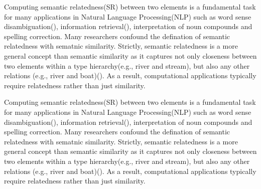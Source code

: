 Computing semantic relatedness(SR) between two elements is a fundamental 
task for many applications in Natural Language Processing(NLP) such as 
word sense disambiguation(\cite{}), information retrieval(\cite{}), 
interpretation of noun compounds and spelling correction. Many researchers
confound the defination of semantic relatedness with sematnic similarity.
Strictly, semantic relatedness is a more general concept than semantic 
similarity as it captures not only closeness between two elements within
a type hierarchy(e.g., river and stream), but also any other relations
(e.g., river and boat)(\cite{BudanitskyH06}). As a result, computational
applications typically require relatedness rather than just similarity.

Computing semantic relatedness(SR) between two elements is a fundamental 
task for many applications in Natural Language Processing(NLP) such as 
word sense disambiguation(\cite{}), information retrieval(\cite{}), 
interpretation of noun compounds and spelling correction. Many researchers
confound the defination of semantic relatedness with sematnic similarity.
Strictly, semantic relatedness is a more general concept than semantic 
similarity as it captures not only closeness between two elements within
a type hierarchy(e.g., river and stream), but also any other relations
(e.g., river and boat)(\cite{BudanitskyH06}). As a result, computational
applications typically require relatedness rather than just similarity.